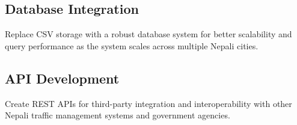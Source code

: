 \documentclass[12pt,a4paper]{report}
\begin{document}
\subsection{Database Integration}
Replace CSV storage with a robust database system for better scalability and query performance as the system scales across multiple Nepali cities.

\subsection{API Development}
Create REST APIs for third-party integration and interoperability with other Nepali traffic management systems and government agencies.


\renewcommand{\bibname}{References}



\clearpage
\end{document}
